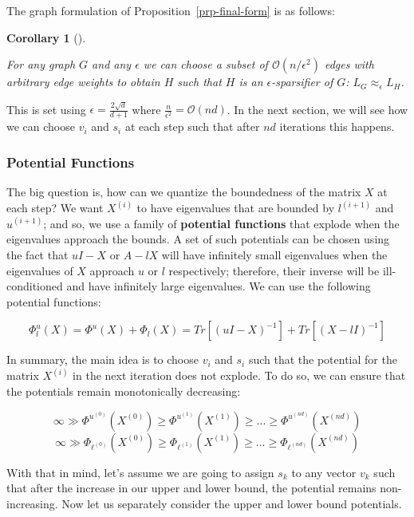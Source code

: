 \documentclass[
  letterpaper,
  DIV=11,
  numbers=noendperiod]{scrartcl}
\theoremstyle{plain}
\newtheorem{corollary}{Corollary}[section]
\theoremstyle{plain}
\theoremstyle{plain}
\theoremstyle{definition}
\theoremstyle{plain}
\theoremstyle{remark}
\begin{document}
The graph formulation of Proposition~\ref{prp-final-form} is as follows:

\leavevmode{}%
\begin{corollary}[]\label{cor-final-form}

For any graph \(G\) and any \(\epsilon\) we can choose a subset of
\(\mathcal{O}(n/\epsilon^2)\) edges with arbitrary edge weights to
obtain \(H\) such that \(H\) is an \(\epsilon\)-sparsifier of \(G\):
\(L_G \approx_\epsilon L_H\).

\end{corollary}

This is set using \(\epsilon = \frac{2\sqrt{d}}{d + 1}\) where
\(\frac{n}{\epsilon^2} = \mathcal{O}(nd)\). In the next section, we will
see how we can choose \(v_i\) and \(s_i\) at each step such that after
\(nd\) iterations this happens.

\hypertarget{potential-functions}{%
\subsubsection{Potential Functions}\label{potential-functions}}

The big question is, how can we quantize the boundedness of the matrix
\(X\) at each step? We want \(X^{(i)}\) to have eigenvalues that are
bounded by \(l^{(i+1)}\) and \(u^{(i+1)}\); and so, we use a family of
\textbf{potential functions} that explode when the eigenvalues approach
the bounds. A set of such potentials can be chosen using the fact that
\(uI - X\) or \(A - lX\) will have infinitely small eigenvalues when the
eigenvalues of \(X\) approach \(u\) or \(l\) respectively; therefore,
their inverse will be ill-conditioned and have infinitely large
eigenvalues. We can use the following potential functions:

\[\Phi^u_l(X) = \Phi^u(X) + \Phi_l(X) = Tr[(uI - X)^{-1}] + Tr[(X - l I)^{-1}]\]

In summary, the main idea is to choose \(v_i\) and \(s_i\) such that the
potential for the matrix \(X^{(i)}\) in the next iteration does not
explode. To do so, we can ensure that the potentials remain
monotonically decreasing:

\[\infty \gg \Phi^{u^{(0)}}(X^{(0)}) \ge \Phi^{u^{(1)}}(X^{(1)}) \ge ... \ge \Phi^{u^{(nd)}}(X^{(nd)})\]
\[\infty \gg \Phi_{\ell^{(0)}}(X^{(0)}) \ge \Phi_{\ell^{(1)}}(X^{(1)}) \ge ... \ge \Phi_{\ell^{(nd)}}(X^{(nd)})\]

With that in mind, let's assume we are going to assign \(s_k\) to any
vector \(v_k\) such that after the increase in our upper and lower
bound, the potential remains non-increasing. Now let us separately
consider the upper and lower bound potentials.
\end{document}
